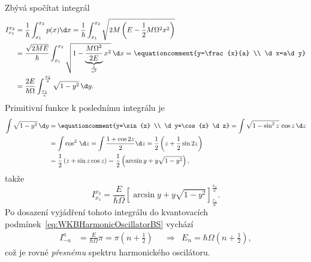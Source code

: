 \begin{solution}
	Zbývá spočítat integrál
	\begin{align}
		I_{x_{1}}^{x_{2}}
			&=\frac{1}{\hbar}\int_{x_{1}}^{x_{2}}p(x)\d x=\frac{1}{\hbar}\int_{x_{1}}^{x_{2}}\sqrt{2M\left(E-\frac{1}{2}M\Omega^{2}x^{2}\right)}\nonumber\\
			&=\frac{\sqrt{2ME}}{\hbar}\int_{x_{1}}^{x_{2}}\sqrt{1-\underbrace{\frac{M\Omega^{2}}{2E}}_{\frac{1}{a^{2}}}x^{2}}\,\d x=\equationcomment{y=\frac{x}{a} \\ \d x=a\d y}\nonumber\\
			&=\frac{2E}{\hbar\Omega}\int_{\frac{x_{1}}{a}}^{\frac{x_{2}}{a}}\sqrt{1-y^{2}}\,\d y.
	\end{align}
	Primitivní funkce k poslednímu integrálu je
	\begin{align}
		\int\sqrt{1-y^{2}}\,\d y
			&=\equationcomment{y=\sin{z} \\ \d y=\cos{z} \d z}=\int\sqrt{1-\sin^{2}z}\,\cos{z}\,\d z\nonumber\\
			&=\int\cos^{2}\,\d z=\int\frac{1+\cos{2z}}{2}\d z=\frac{1}{2}\left(z+\frac{1}{2}\sin{2z}\right)\nonumber\\
			&=\frac{1}{2}\left(z+\sin{z}\cos{z}\right)=\frac{1}{2}\left(\arcsin{y}+y\sqrt{1-y^{2}}\right),
			\label{eq:intsqrt}
	\end{align}
	takže
	\begin{equation}
		I_{x_{1}}^{x_{2}}=\frac{E}{\hbar\Omega}\left[\arcsin{y}+y\sqrt{1-y^{2}}\right]_{\frac{x_{1}}{a}}^{\frac{x_{2}}{a}}.
	\end{equation}
	Po dosazení vyjádření tohoto integrálu do kvantovacích podmínek~\eqref{eq:WKBHarmonicOscillatorBS} vychází
	\begin{align}
		I_{-a}^{a}&=\frac{E}{\hbar\Omega}\pi=\pi\left(n+\frac{1}{2}\right) && \Longrightarrow & E_{n}=\hbar\Omega\left(n+\frac{1}{2}\right),
	\end{align}
	což je rovné \emph{přesnému} spektru harmonického oscilátoru.


\end{solution}
